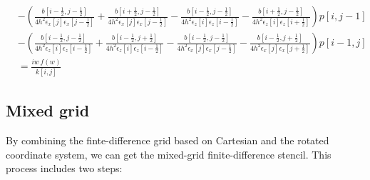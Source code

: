 \documentclass[revised,endfloat]{geophysics}
\begin{document}
\begin{equation}
\begin{split}
                          &-(\frac{b[i-\frac{1}{2}, j-\frac{1}{2}]}{4h^2 \epsilon_x[j] \epsilon_x[j-\frac{1}{2}]} + \frac{b[i+\frac{1}{2}, j-\frac{1}{2}]}{4h^2 \epsilon_x[j] \epsilon_x[j-\frac{1}{2}]} - \frac{b[i-\frac{1}{2}, j-\frac{1}{2}]}{4h^2 \epsilon_z[i] \epsilon_z[i-\frac{1}{2}]} - \frac{b[i+\frac{1}{2}, j-\frac{1}{2}]}{4h^2 \epsilon_z[i] \epsilon_z[i+\frac{1}{2}]} )p[i,j-1] \\
                          &-(\frac{b[i-\frac{1}{2}, j-\frac{1}{2}]}{4h^2 \epsilon_z[i] \epsilon_z[i-\frac{1}{2}]} + \frac{b[i-\frac{1}{2}, j+\frac{1}{2}]}{4h^2 \epsilon_z[i] \epsilon_z[i-\frac{1}{2}]} - \frac{b[i-\frac{1}{2}, j-\frac{1}{2}]}{4h^2 \epsilon_x[j] \epsilon_x[j-\frac{1}{2}]} - \frac{b[i-\frac{1}{2}, j+\frac{1}{2}]}{4h^2 \epsilon_x[j] \epsilon_x[j+\frac{1}{2}]} )p[i-1,j] \\
                          &= \frac{iw\,f(w)}{k[i,j]}
\end{split} 
\label{eq111}
\end{equation}

\subsection{Mixed grid}
By combining the finte-difference grid based on Cartesian and the rotated coordinate system, we can get the mixed-grid finite-difference stencil. This process includes two steps:
\end{document}
